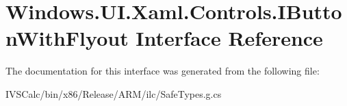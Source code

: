 \hypertarget{interface_windows_1_1_u_i_1_1_xaml_1_1_controls_1_1_i_button_with_flyout}{}\section{Windows.\+U\+I.\+Xaml.\+Controls.\+I\+Button\+With\+Flyout Interface Reference}
\label{interface_windows_1_1_u_i_1_1_xaml_1_1_controls_1_1_i_button_with_flyout}


The documentation for this interface was generated from the following file\+:\begin{DoxyCompactItemize}
\item 
I\+V\+S\+Calc/bin/x86/\+Release/\+A\+R\+M/ilc/Safe\+Types.\+g.\+cs\end{DoxyCompactItemize}
